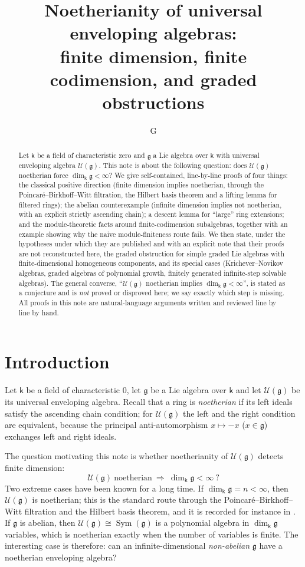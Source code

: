 \documentclass[11pt]{ctexart}
\title{Noetherianity of universal enveloping algebras:\\[2pt]
\large finite dimension, finite codimension, and graded obstructions}
\author{G}
\date{}
\theoremstyle{plain}
\theoremstyle{definition}
\theoremstyle{remark}
\newcommand{\kk}{\mathsf{k}}
\newcommand{\gl}{\mathfrak{g}}
\newcommand{\UU}{\mathcal{U}}
\newcommand{\Sym}{\operatorname{Sym}}
\begin{document}
\maketitle

\begin{abstract}
Let $\kk$ be a field of characteristic zero and $\gl$ a Lie algebra over $\kk$ with
universal enveloping algebra $\UU(\gl)$. This note is about the following question:
does $\UU(\gl)$ noetherian force $\dim_\kk\gl<\infty$? We give self-contained,
line-by-line proofs of four things: the classical positive direction (finite
dimension implies noetherian, through the Poincar\'e--Birkhoff--Witt filtration,
the Hilbert basis theorem and a lifting lemma for filtered rings); the abelian
counterexample (infinite dimension implies not noetherian, with an explicit
strictly ascending chain); a descent lemma for ``large'' ring extensions; and the
module-theoretic facts around finite-codimension subalgebras, together with an
example showing why the naive module-finiteness route fails. We then state, under
the hypotheses under which they are published and with an explicit note that their
proofs are not reconstructed here, the graded obstruction for simple graded Lie
algebras with finite-dimensional homogeneous components, and its special cases
(Krichever--Novikov algebras, graded algebras of polynomial growth, finitely
generated infinite-step solvable algebras). The general converse,
``$\UU(\gl)$ noetherian implies $\dim_\kk\gl<\infty$'', is stated as a conjecture
and is \emph{not} proved or disproved here; we say exactly which step is missing.
All proofs in this note are natural-language arguments written and reviewed line by
line by hand.
\end{abstract}

\section{Introduction}

Let $\kk$ be a field of characteristic $0$, let $\gl$ be a Lie algebra over $\kk$ and
let $\UU(\gl)$ be its universal enveloping algebra. Recall that a ring is
\emph{noetherian} if its left ideals satisfy the ascending chain condition; for
$\UU(\gl)$ the left and the right condition are equivalent, because the principal
anti-automorphism $x\mapsto -x$ ($x\in\gl$) exchanges left and right ideals.

The question motivating this note is whether noetherianity of $\UU(\gl)$ detects
finite dimension:
\begin{equation}\label{eq:Q}
\UU(\gl)\ \text{noetherian}\ \Longrightarrow\ \dim_\kk\gl<\infty\ ?
\end{equation}
Two extreme cases have been known for a long time. If $\dim_\kk\gl=n<\infty$, then
$\UU(\gl)$ is noetherian; this is the standard route through the
Poincar\'e--Birkhoff--Witt filtration and the Hilbert basis theorem, and it is
recorded for instance in \cite[Chapter 1]{MR01}. If $\gl$ is abelian, then
$\UU(\gl)\cong\Sym(\gl)$ is a polynomial algebra in $\dim_\kk\gl$ variables, which is
noetherian exactly when the number of variables is finite. The interesting case is
therefore: can an infinite-dimensional \emph{non-abelian} $\gl$ have a noetherian
enveloping algebra?
\end{document}
